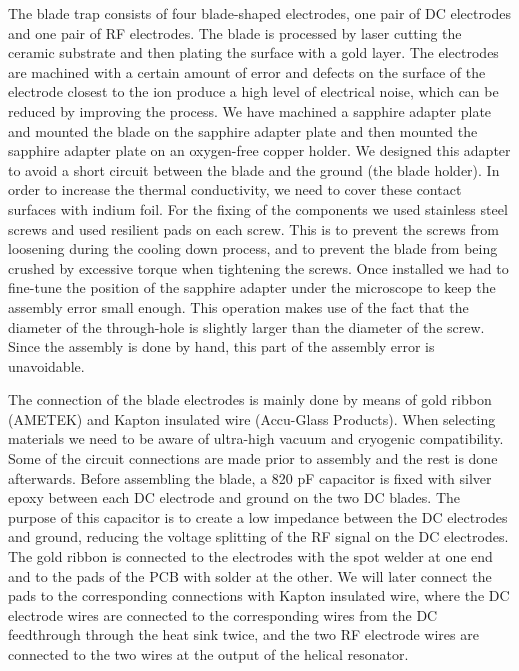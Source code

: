 The blade trap consists of four blade-shaped electrodes, one pair of DC electrodes and one pair of RF electrodes. The blade is processed by laser cutting the ceramic substrate and then plating the surface with a gold layer. The electrodes are machined with a certain amount of error and defects on the surface of the electrode closest to the ion produce a high level of electrical noise, which can be reduced by improving the process. We have machined a sapphire adapter plate and mounted the blade on the sapphire adapter plate and then mounted the sapphire adapter plate on an oxygen-free copper holder. We designed this adapter to avoid a short circuit between the blade and the ground (the blade holder). In order to increase the thermal conductivity, we need to cover these contact surfaces with indium foil. For the fixing of the components we used stainless steel screws and used resilient pads on each screw. This is to prevent the screws from loosening during the cooling down process, and to prevent the blade from being crushed by excessive torque when tightening the screws. Once installed we had to fine-tune the position of the sapphire adapter under the microscope to keep the assembly error small enough. This operation makes use of the fact that the diameter of the through-hole is slightly larger than the diameter of the screw. Since the assembly is done by hand, this part of the assembly error is unavoidable.

The connection of the blade electrodes is mainly done by means of gold ribbon (AMETEK) and Kapton insulated wire (Accu-Glass Products). When selecting materials we need to be aware of ultra-high vacuum and cryogenic compatibility. Some of the circuit connections are made prior to assembly and the rest is done afterwards. Before assembling the blade, a 820 pF capacitor is fixed with silver epoxy between each DC electrode and ground on the two DC blades. The purpose of this capacitor is to create a low impedance between the DC electrodes and ground, reducing the voltage splitting of the RF signal on the DC electrodes. The gold ribbon is connected to the electrodes with the spot welder at one end and to the pads of the PCB with solder at the other. We will later connect the pads to the corresponding connections with Kapton insulated wire, where the DC electrode wires are connected to the corresponding wires from the DC feedthrough through the heat sink twice, and the two RF electrode wires are connected to the two wires at the output of the helical resonator.



